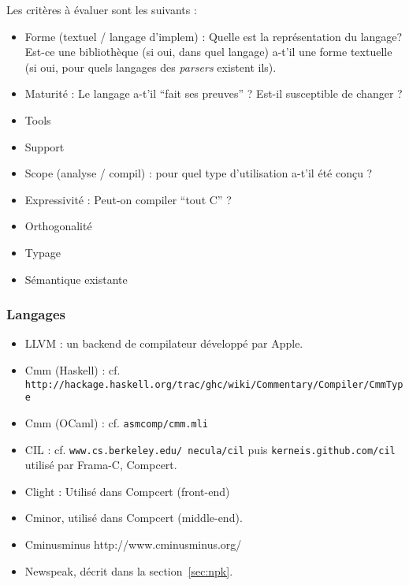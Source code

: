 Les critères à évaluer sont les suivants :

\begin{itemize}
\item
  Forme (textuel / langage d'implem) : Quelle est la représentation du
  langage? Est-ce une bibliothèque (si oui, dans quel langage) a-t'il
  une forme textuelle (si oui, pour quels langages des \emph{parsers}
  existent ils).
\item
  Maturité : Le langage a-t'il ``fait ses preuves'' ? Est-il susceptible
  de changer ?
\item
  Tools
\item
  Support
\item
  Scope (analyse / compil) : pour quel type d'utilisation a-t'il été
  conçu ?
\item Expressivité : Peut-on compiler ``tout C'' ?
\item Orthogonalité
\item Typage
\item Sémantique existante
\end{itemize}

\subsubsection{Langages}

\begin{itemize}
\item
  LLVM\cite{llvm-pres} : un backend de compilateur développé par Apple.
\item
  Cmm (Haskell) : cf.
  \texttt{http://hackage.haskell.org/trac/ghc/wiki/Commentary/Compiler/CmmType}
\item
  Cmm (OCaml) : cf. \texttt{asmcomp/cmm.mli}
\item
  CIL\cite{NeculaCil} : cf. \texttt{www.cs.berkeley.edu/~necula/cil} puis
  \texttt{kerneis.github.com/cil} utilisé par Frama-C, Compcert.
\item
  Clight\cite{cfront} : Utilisé dans Compcert (front-end)
\item
  Cminor\cite{cminorSL}, utilisé dans Compcert (middle-end).
\item
  Cminusminus \cite{spjcmm} http://www.cminusminus.org/
\item
  Newspeak\cite{newspeak}, décrit dans la section~\ref{sec:npk}.
\end{itemize}

